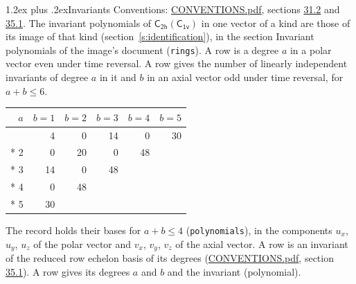 \documentclass[10pt,a4paper]{article}
\makeatletter
\renewcommand\section{\@startsection{section}{1}{\z@}{-3ex plus -1ex minus -.2ex}%
  {1.2ex plus .2ex}{\normalfont\large\sffamily\bfseries\color{parttitle}}}
\numberwithin{equation}{section}
\newcommand{\grp}[1]{\mathsf{#1}}
\makeatother
\begin{document}
\section{Invariants}\label{s:invariants}
Conventions: \href{../../CONVENTIONS.pdf}{CONVENTIONS.pdf}, sections \href{../../CONVENTIONS.pdf\#conv.31.2}{31.2} and \href{../../CONVENTIONS.pdf\#conv.35.1}{35.1}.
The invariant polynomials of $\grp{C_{2h}}(\grp{C_{1v}})$ in one vector of a kind are those of its image of that kind (section~\ref{s:identification}), in the section Invariant polynomials of the image's document (\texttt{rings}).
\leavevmode\label{n:index.degree.polar}\label{n:index.degree.axial}A row is a degree $a$ in a polar vector even under time reversal. A row gives the number of linearly independent invariants of degree $a$ in it and $b$ in an axial vector odd under time reversal, for $a + b \le 6$.
{\small\begin{longtable}{@{}rrrrrr@{}}\toprule
$a$ & $b = 1$ & $b = 2$ & $b = 3$ & $b = 4$ & $b = 5$\\\midrule\endhead
\bottomrule\endfoot\endlastfoot
1 & 4 & 0 & 14 & 0 & 30\\*
2 & 0 & 20 & 0 & 48 & \\*
3 & 14 & 0 & 48 &  & \\*
4 & 0 & 48 &  &  & \\*
5 & 30 &  &  &  & \\
\bottomrule\end{longtable}}
\leavevmode\label{n:local.component.polar}\label{n:local.component.axial}The record holds their bases for $a + b \le 4$ (\texttt{polynomials}), in the components $u_{x}$, $u_{y}$, $u_{z}$ of the polar vector and $v_{x}$, $v_{y}$, $v_{z}$ of the axial vector. \label{n:head.polynomial}A row is an invariant of the reduced row echelon basis of its degrees (\href{../../CONVENTIONS.pdf}{CONVENTIONS.pdf}, section \href{../../CONVENTIONS.pdf\#conv.35.1}{35.1}). A row gives its degrees $a$ and $b$ and the invariant (polynomial).
\end{document}
